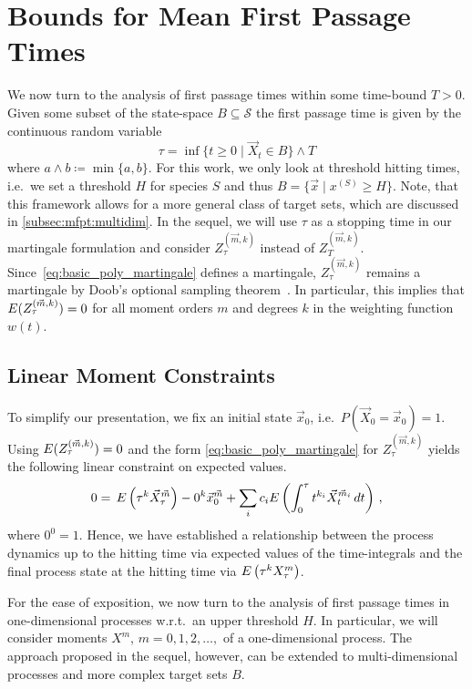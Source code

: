 \section{Bounds for Mean First Passage Times}\label{sec:mfpt:mfpt_bounds}
We now turn to the analysis of first passage times within some time-bound
$T>0$. Given some subset of the state-space
$B\subseteq \mathcal{S}$ the first passage time is given by the continuous random variable $$\tau = \inf\{t\geq 0\mid \vec X_t \in B\} \land T$$
where $a \land b \coloneqq \min\{a, b\}$.
For this work, we only look at threshold hitting times,
i.e.\ we set a threshold $H$ for species $S$ and thus $B=\{\vec{x}\mid x^{(S)}\geq
H\}$. Note, that this framework
allows for a more general class of target sets, which are discussed in
\autoref{subsec:mfpt:multidim}.
In the sequel, we will use $\tau$ as a stopping time in our martingale
formulation and consider
$Z_\tau^{(\vec m, k)}$ instead of $Z_T^{(\vec m, k)}$.
Since~\eqref{eq:basic_poly_martingale} defines a martingale, $Z_{\tau}^{(\vec m, k)}$
remains a martingale by
Doob's optional sampling theorem~\cite{gihmantheory}. In particular, this
implies that ${E}(Z_{\tau}^{(\vec m, k)})=0$ for all moment orders $m$ and
degrees $k$ in the weighting function $w(t)$.

\subsection{Linear Moment Constraints}
To simplify our presentation, we fix an initial state $\vec x_0$, i.e.\ $P(\vec X_0=\vec x_0)=1$.
Using ${E}(Z_{\tau}^{(\vec m, k)})=0$ and the form
\eqref{eq:basic_poly_martingale} for $Z_{\tau}^{(\vec m, k)}$
yields the following linear constraint on expected values.
\begin{equation}\label{eq:constraint}
    0 = \,{E}\left({\tau}^k\vec X_{\tau}^{\vec m}\right)
        - 0^k\vec x_0^{\vec m}
        + \sum_{i}c_i{E}\left(\int_{0}^{\tau} t^{k_i} \vec X_t^{\vec m_i}\,dt\right)\,,
\end{equation}
where $0^0=1$.
Hence, we have established a relationship between the process dynamics
up to the hitting time via expected values of the time-integrals and the final process state at
the hitting time via ${E}\left(\tau^k {X}_{\tau}^{{m}}\right)$.

For the ease of exposition, we now turn to the analysis of first passage times in
one-dimensional processes w.r.t.\ an upper threshold $H$. In particular,
we will consider  moments $X^m$, $m=0,1,2,\dots,$ of a one-dimensional process.
The   approach proposed in the sequel, however,
can be extended to multi-dimensional processes and more complex target sets $B$.

